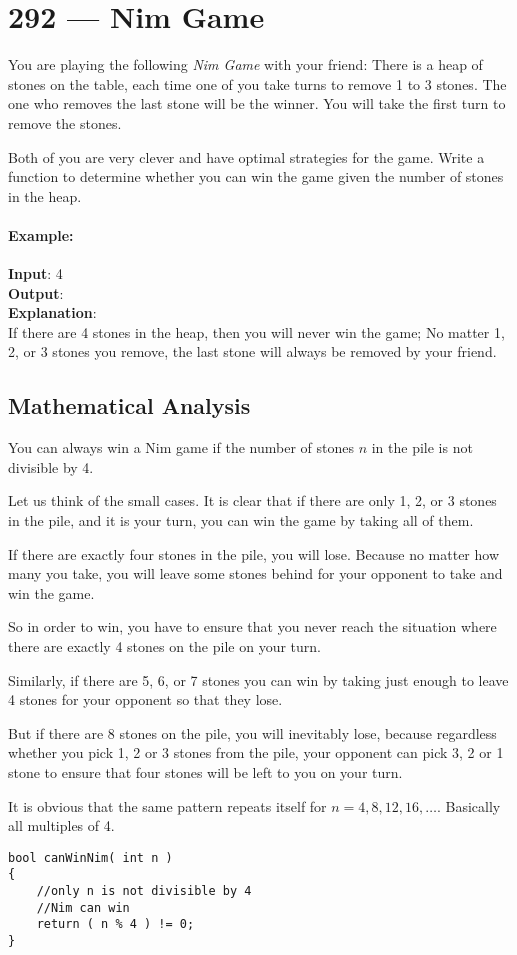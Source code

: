 \section{292 --- Nim Game}
You are playing the following \textit{Nim Game} with your friend: There is a heap of stones on the table, each time one of you take turns to remove 1 to 3 stones. The one who removes the last stone will be the winner. You will take the first turn to remove the stones.

Both of you are very clever and have optimal strategies for the game. Write a function to determine whether you can win the game given the number of stones in the heap.

\paragraph{Example:}

\begin{flushleft}
\textbf{Input}: 4
\\
\textbf{Output}:  
\\
\textbf{Explanation}: 
\\
If there are 4 stones in the heap, then you will never win the game; No matter 1, 2, or 3 stones you remove, the last stone will always be removed by your friend.
\end{flushleft}
\subsection{Mathematical Analysis}
You can always win a Nim game if the number of stones $n$ in the pile is not divisible by 4.

Let us think of the small cases. It is clear that if there are only 1, 2, or 3 stones in the pile, and it is your turn, you can win the game by taking all of them. 

If there are exactly four stones in the pile, you will lose. Because no matter how many you take, you will leave some stones behind for your opponent to take and win the game.

So in order to win, you have to ensure that you never reach the situation where there are exactly 4 stones on the pile on your turn.

Similarly, if there are 5, 6, or 7 stones you can win by taking just enough to leave 4 stones for your opponent so that they lose. 

But if there are 8 stones on the pile, you will inevitably lose, because regardless whether you pick 1, 2 or 3 stones from the pile, your opponent can pick 3, 2 or 1 stone to ensure that four stones will be left to you on your turn.

It is obvious that the same pattern repeats itself for $n=4,8,12,16,\dots$. Basically all multiples of 4.

\setcounter{lstlisting}{0}
\begin{lstlisting}[style=customc, caption={Induction}]
bool canWinNim( int n )
{
    //only n is not divisible by 4
    //Nim can win
    return ( n % 4 ) != 0;
}
\end{lstlisting}